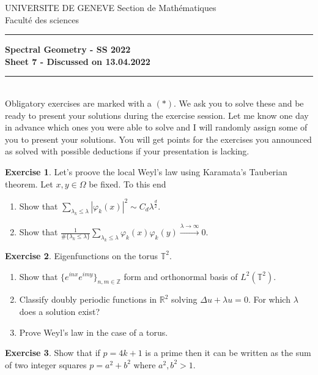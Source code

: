\documentclass[a4paper,11pt]{article}
\theoremstyle{definition}
\newtheorem{exercise}{Exercise}
\begin{document}
\pagestyle{headings}
\noindent UNIVERSITE DE GENEVE \hfill Section de Mathématiques\\
\noindent Facult\'e des sciences \hfill \\[-3mm]
\hrule

\large

\begin{center}
\textbf{Spectral Geometry - SS 2022 \\ Sheet 7 - Discussed on 13.04.2022}
\end{center}
\hrule
\text{}\\[1cm]

Obligatory exercises are marked with a $(*)$. We ask you to solve these and be ready to present your solutions during the exercise session. Let me know one day in advance which ones you were able to solve and I will randomly assign some of you to present your solutions. You will get points for the exercises you announced as solved with possible deductions if your presentation is lacking.

\begin{exercise}
	Let's proove the local Weyl's law using Karamata's Tauberian theorem. Let $x, y \in \Omega$ be fixed. To this end
	\begin{enumerate}
		\item Show that $\sum_{\lambda_k \leq \lambda} |\varphi_k(x)|^2 \sim C_d \lambda^{\frac{d}{2}}.$
		\item Show that $\frac{1}{\#\{\lambda_k \leq \lambda\}} \sum_{\lambda_k \leq \lambda} \varphi_k(x) \varphi_k(y) \xrightarrow{\lambda \to \infty} 0.$
	\end{enumerate}
\end{exercise}

\begin{exercise}
	Eigenfunctions on the torus $\mathbb{T}^2$. 
	\begin{enumerate}
		\item Show that $\{e^{inx} e^{imy}\}_{n,m \in \mathbb{Z}}$ form and orthonormal basis of $L^2(\mathbb{T}^2)$.
		\item Classify doubly periodic functions in $\mathbb{R}^2$ solving $\Delta u + \lambda u = 0$. For which $\lambda$ does a solution exist?
		\item Prove Weyl's law in the case of a torus.
	\end{enumerate}
\end{exercise}

\begin{exercise}
	Show that if $p = 4k + 1$ is a prime then it can be written as the sum of two integer squares $p = a^2 + b^2$ where $a^2, b^2 > 1$.
\end{exercise}
\end{document}
